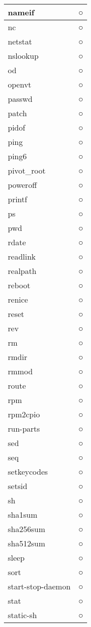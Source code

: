 \begin{longtable}{p{60mm}p{60mm}}
nameif & ○ \\ \hline
nc & ○ \\ \hline
netstat & ○ \\ \hline
nslookup & ○ \\ \hline
od & ○ \\ \hline
openvt & ○ \\ \hline
passwd & ○ \\ \hline
patch & ○ \\ \hline
pidof & ○ \\ \hline
ping & ○ \\ \hline
ping6 & ○ \\ \hline
pivot_root & ○ \\ \hline
poweroff & ○ \\ \hline
printf & ○ \\ \hline
ps & ○ \\ \hline
pwd & ○ \\ \hline
rdate & ○ \\ \hline
readlink & ○ \\ \hline
realpath & ○ \\ \hline
reboot & ○ \\ \hline
renice & ○ \\ \hline
reset & ○ \\ \hline
rev & ○ \\ \hline
rm & ○ \\ \hline
rmdir & ○ \\ \hline
rmmod & ○ \\ \hline
route & ○ \\ \hline
rpm & ○ \\ \hline
rpm2cpio & ○ \\ \hline
run-parts & ○ \\ \hline
sed & ○ \\ \hline
seq & ○ \\ \hline
setkeycodes & ○ \\ \hline
setsid & ○ \\ \hline
sh & ○ \\ \hline
sha1sum & ○ \\ \hline
sha256sum & ○ \\ \hline
sha512sum & ○ \\ \hline
sleep & ○ \\ \hline
sort & ○ \\ \hline
start-stop-daemon & ○ \\ \hline
stat & ○ \\ \hline
static-sh & ○ \\ \hline

\end{longtable}
